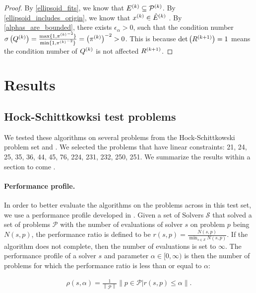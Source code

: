\documentclass{article}
\begin{document}
\begin{proof}
By \cref{ellipsoid_fits}, we know that ${E^{(k)}} \subseteq {{\mathcal{P}}^{(k)}}$.
By \cref{ellipsoid_includes_origin}, we know that $x^{(k)} \in {{\hat E}^{(k)}}$ .
By \cref{alphas_are_bounded}, there exists $\epsilon_{\alpha} > 0$, such that the condition number 
${\sigma}\left({Q^{(k)}}\right) = \frac{\max\{1, {\pi^{(k)}}^{-2}\}}{\min\{1, {\pi^{(k)}}^{-2}\}} = \left({\pi^{(k)}}\right)^{-2} > 0$.
This is because $\det\left({R^{(k+1)}}\right) = 1$ means the condition number of ${Q^{(k)}}$ is not affected ${R^{(k+1)}}$.
\end{proof}


\section{Results}


\subsection{Hock-Schittkowksi test problems}


We tested these algorithms on several problems from the Hock-Schittkowski problem set \cite{Schittkowski1981MoreTE} and \cite{Hock1980}.
We selected the problems that have linear constraints: 21, 24, 25, 35, 36, 44, 45, 76, 224, 231, 232, 250, 251.
We summarize the results within \color{magenta} a section to come \color{black}.


\paragraph*{Performance profile.}
\label{performance_profile}
In order to better evaluate the algorithms on the problems across in this test set, we use a performance profile developed in \cite{More:2009:BDO:1654367.1654371}.
Given a set of Solvers $\mathcal S$ that solved a set of problems $\mathcal P$ with the number of evaluations of solver $s$ on problem $p$ being $N(s, p)$, the performance ratio is defined to be $r(s, p) = \frac{N(s, p)}{\min_{s \in \mathcal S} N(s, p)}$.
If the algorithm does not complete, then the number of evaluations is set to $\infty$.
The performance profile of a solver $s$ and parameter $\alpha \in [0, \infty)$ is then the number of problems for which the performance ratio is less than or equal to $\alpha$: 

\begin{align}
\rho(s, \alpha) = \frac 1 {\left\|\mathcal P \right\|} \left\|p \in \mathcal P | r(s, p) \le \alpha\right\|.
\end{align}
\end{document}
